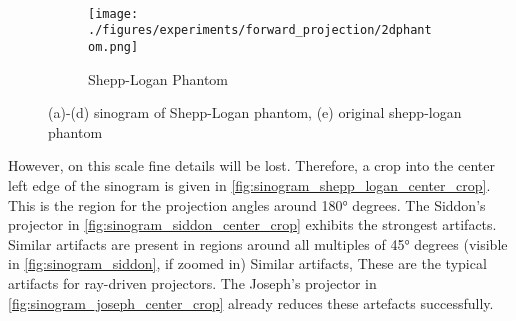 \begin{figure}[h]
	\centering
	 \\
	\begin{subfigure}[b]{0.3125\textwidth}
		\texttt{[image: ./figures/experiments/forward\_projection/2dphantom.png]}
		\caption{Shepp-Logan Phantom}\label{fig:shepp_logan_phantom}
	\end{subfigure}
	\caption{(a)-(d) sinogram of Shepp-Logan phantom, (e) original shepp-logan phantom}%
	\label{fig:sinogram_shepp_logan}
\end{figure}

However, on this scale fine details will be lost. Therefore, a crop into the center left edge of the
sinogram is given in \autoref{fig:sinogram_shepp_logan_center_crop}. This is the region for the
projection angles around 180° degrees. The Siddon's projector in
\autoref{fig:sinogram_siddon_center_crop} exhibits the strongest artifacts. Similar artifacts are
present in regions around all multiples of 45° degrees (visible in \autoref{fig:sinogram_siddon}, if
zoomed in) Similar artifacts, These are the typical artifacts for ray-driven projectors. The
Joseph's projector in \autoref{fig:sinogram_joseph_center_crop} already reduces these artefacts
successfully.

